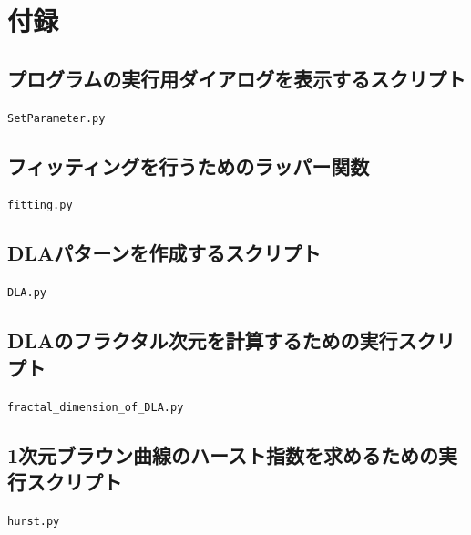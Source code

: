 \documentclass{jsarticle}
\theoremstyle{definition}
\begin{document}
\newpage
\section{付録}

\subsection{プログラムの実行用ダイアログを表示するスクリプト}\label{setparameter}
\texttt{SetParameter.py}

\subsection{フィッティングを行うためのラッパー関数}\label{fitting}
\texttt{fitting.py}

\subsection{DLAパターンを作成するスクリプト}\label{dla}
\texttt{DLA.py}

\subsection{DLAのフラクタル次元を計算するための実行スクリプト}\label{fractaldim}
\texttt{fractal\_dimension\_of\_DLA.py}

\subsection{1次元ブラウン曲線のハースト指数を求めるための実行スクリプト}\label{hurst}
\texttt{hurst.py}

% 
% 
\end{document}
